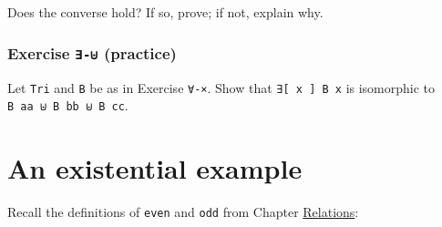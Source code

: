\begin{fence}
\begin{code}%
\>[0]\<%
\\
\>[0][@{}l@{\AgdaIndent{0}}]%
\>[2]\AgdaSpace{}%
\AgdaSymbol{:}\AgdaSpace{}%
\AgdaSpace{}%
\AgdaSymbol{\{}\AgdaSpace{}%
\AgdaSymbol{:}\AgdaSpace{}%
\AgdaSymbol{\}}\AgdaSpace{}%
\AgdaSymbol{\{}\AgdaSpace{}%
\AgdaSpace{}%
\AgdaSymbol{:}\AgdaSpace{}%
\AgdaSpace{}%
\AgdaSpace{}%
\AgdaSymbol{\}}\AgdaSpace{}%
\<%
\\
\>[2][@{}l@{\AgdaIndent{0}}]%
\>[4]\AgdaFunction{∃[}\AgdaSpace{}%
\AgdaSpace{}%
\AgdaFunction{]}\AgdaSpace{}%
\AgdaSymbol{(}\AgdaSpace{}%
\AgdaSpace{}%
\AgdaSpace{}%
\AgdaSpace{}%
\AgdaSymbol{)}\AgdaSpace{}%
\AgdaSpace{}%
\AgdaSymbol{(}\AgdaFunction{∃[}\AgdaSpace{}%
\AgdaSpace{}%
\AgdaFunction{]}\AgdaSpace{}%
\AgdaSpace{}%
\AgdaSymbol{)}\AgdaSpace{}%
\AgdaSpace{}%
\AgdaSymbol{(}\AgdaFunction{∃[}\AgdaSpace{}%
\AgdaSpace{}%
\AgdaFunction{]}\AgdaSpace{}%
\AgdaSpace{}%
\AgdaSymbol{)}\<%
\end{code}
\end{fence}

Does the converse hold? If so, prove; if not, explain why.

\hypertarget{exercise---practice-1}{%
\subsubsection{\texorpdfstring{Exercise \texttt{∃-⊎}
(practice)}{Exercise ∃-⊎ (practice)}}\label{exercise---practice-1}}

Let \texttt{Tri} and \texttt{B} be as in Exercise \texttt{∀-×}. Show
that \texttt{∃{[}\ x\ {]}\ B\ x} is isomorphic to
\texttt{B\ aa\ ⊎\ B\ bb\ ⊎\ B\ cc}.

\hypertarget{an-existential-example}{%
\section{An existential example}\label{an-existential-example}}

Recall the definitions of \texttt{even} and \texttt{odd} from Chapter
\protect\hyperlink{Relations}{Relations}:

